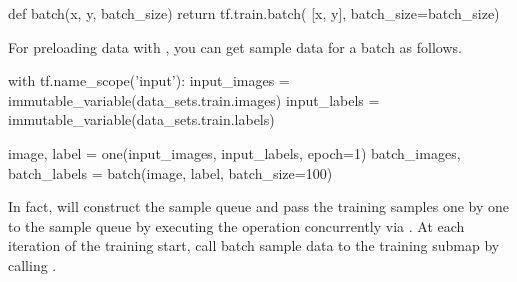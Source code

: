 \begin{content}
\begin{leftbar}
\begin{python}
def batch(x, y, batch_size)
  return tf.train.batch(
    [x, y], batch_size=batch_size)
\end{python}
\end{leftbar}

For preloading data with , you can get sample data for a batch as follows.

\begin{leftbar}
\begin{python}
with tf.name_scope('input'):
  input_images = immutable_variable(data_sets.train.images)
  input_labels = immutable_variable(data_sets.train.labels)

  image, label = one(input_images, input_labels, epoch=1)
  batch_images, batch_labels = batch(image, label, batch_size=100)
\end{python}
\end{leftbar}

In fact,  will construct the sample queue and pass the training samples one by one to the sample queue by executing the  operation concurrently via . At each iteration of the training start, call  batch sample data to the training submap by calling .

\end{content}


